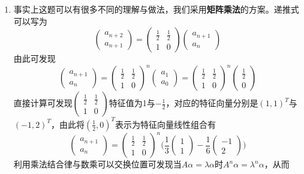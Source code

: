 \documentclass[a4paper,UTF8,fontset=windows,AutoFakeBold]{ctexart}
\begin{document}
\begin{enumerate}
    \item
    事实上这题可以有很多不同的理解与做法，我们采用\textbf{矩阵乘法}的方案。递推式可以写为
    $$\begin{pmatrix}a_{n+2}\\a_{n+1}\end{pmatrix}=\begin{pmatrix}\frac{1}{2}&\frac{1}{2}\\1&0\end{pmatrix}\begin{pmatrix}a_{n+1}\\a_n\end{pmatrix}$$
    由此可发现
    $$\begin{pmatrix}a_{n+1}\\a_n\end{pmatrix}=\begin{pmatrix}\frac{1}{2}&\frac{1}{2}\\1&0\end{pmatrix}^n\begin{pmatrix}a_1\\a_0\end{pmatrix}=\begin{pmatrix}\frac{1}{2}&\frac{1}{2}\\1&0\end{pmatrix}^n\begin{pmatrix}\frac{1}{2}\\0\end{pmatrix}$$
    直接计算可发现$\begin{pmatrix}\frac{1}{2}&\frac{1}{2}\\1&0\end{pmatrix}$特征值为1与$-\frac{1}{2}$，对应的特征向量分别是$(1,1)^T$与$(-1,2)^T$，由此将$(\frac{1}{2},0)^T$表示为特征向量线性组合有
    $$\begin{pmatrix}a_{n+1}\\a_n\end{pmatrix}=\begin{pmatrix}\frac{1}{2}&\frac{1}{2}\\1&0\end{pmatrix}^n\bigg(\frac{1}{3}\begin{pmatrix}1\\1\end{pmatrix}-\frac{1}{6}\begin{pmatrix}-1\\2\end{pmatrix}\bigg)$$
    利用乘法结合律与数乘可以交换位置可发现当$A\alpha=\lambda\alpha$时$A^n\alpha=\lambda^n\alpha$，从而

\end{enumerate}
\end{document}
